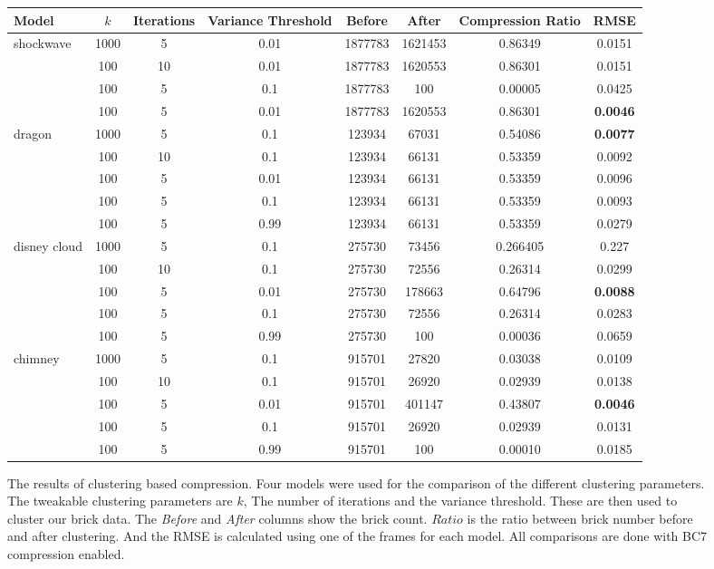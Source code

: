 \begin{figure}[H]
{    \begin{tabular}{|l|ccc|cccc|}
        \toprule
        \hline
        Model & $k$ & Iterations & Variance Threshold & Before & After & Compression Ratio & RMSE \\
        \hline
        \midrule
        shockwave & 1000 & 5 & 0.01 & 1877783 & 1621453 & 0.86349 & 0.0151 \\
        & 100 & 10 & 0.01 & 1877783 & 1620553 & 0.86301 & 0.0151 \\
        & 100 & 5 & 0.1 & 1877783 & 100 & 0.00005 & 0.0425 \\
        & 100 & 5 & 0.01 & 1877783 & 1620553 & 0.86301 & \textbf{0.0046} \\
        \hline
        \midrule
        dragon & 1000 & 5 & 0.1 & 123934 & 67031 & 0.54086 & \textbf{0.0077} \\
        & 100 & 10 & 0.1 & 123934 & 66131 & 0.53359 & 0.0092 \\
        & 100 & 5 & 0.01 & 123934 & 66131 & 0.53359 & 0.0096 \\
        & 100 & 5 & 0.1 & 123934 & 66131 & 0.53359 & 0.0093 \\
        & 100 & 5 & 0.99 & 123934 & 66131 & 0.53359 & 0.0279 \\
        \hline
        \midrule
        disney cloud & 1000 & 5 & 0.1 & 275730 & 73456 & 0.266405 & 0.227 \\
        & 100 & 10 & 0.1 & 275730 & 72556 & 0.26314 & 0.0299 \\
        & 100 & 5 & 0.01 & 275730 & 178663 & 0.64796 & \textbf{0.0088} \\
        & 100 & 5 & 0.1 & 275730 & 72556 & 0.26314 & 0.0283 \\
        & 100 & 5 & 0.99 & 275730 & 100 & 0.00036 & 0.0659 \\
        \hline
        \midrule
        chimney & 1000 & 5 & 0.1 & 915701 & 27820 & 0.03038 & 0.0109 \\
        & 100 & 10 & 0.1 & 915701 & 26920 & 0.02939 & 0.0138 \\
        & 100 & 5 & 0.01 & 915701 & 401147 & 0.43807 & \textbf{0.0046} \\
        & 100 & 5 & 0.1 & 915701 & 26920 & 0.02939 & 0.0131 \\
        & 100 & 5 & 0.99 & 915701 & 100 & 0.00010 & 0.0185 \\
        \hline
        \bottomrule
      \end{tabular}
    \label{tab:block_compression_visualized:table}
    }

    \caption{The results of clustering based compression. Four models were used for the comparison of the different clustering parameters. The tweakable clustering parameters are $k$, The number of iterations and the variance threshold. These are then used to cluster our brick data. The \textit{Before} and \textit{After} columns show the brick count. $Ratio$ is the ratio between brick number before and after clustering. And the RMSE is calculated using one of the frames for each model. All comparisons are done with BC7 compression enabled.} \label{fig:block_compression_visualized}
\end{figure}


